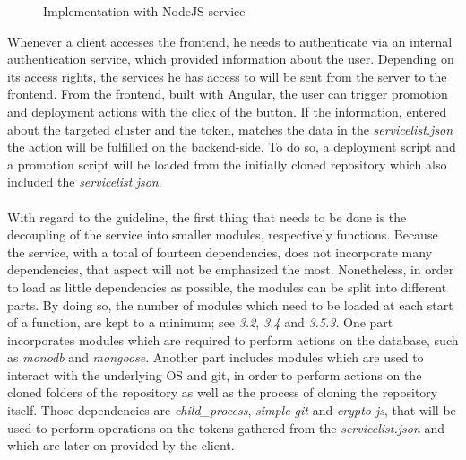 \documentclass[a4paper,twoside,11pt, pagesize]{scrartcl}
\begin{document}
\begin{spacing}{1.2}
\begin{figure}[H]
\caption{Implementation with NodeJS service}
\end{figure}  
Whenever a client accesses the frontend, he needs to authenticate via an internal authentication service, which provided information about the user. Depending on its access rights, the services he has access to will be sent from the server to the frontend. From the frontend, built with Angular, the user can trigger promotion and deployment actions with the click of the button. If the information, entered about the targeted cluster and the token, matches the data in the \textit{servicelist.json} the action will be fulfilled on the backend-side. To do so, a deployment script and a promotion script will be loaded from the initially cloned repository which also included the \textit{servicelist.json}. \\\\With regard to the guideline, the first thing that needs to be done is the decoupling of the service into smaller modules, respectively functions. Because the service, with a total of fourteen dependencies, does not incorporate many dependencies, that aspect will not be emphasized the most. Nonetheless, in order to load as little dependencies as possible, the modules can be split into different parts. By doing so, the number of modules which need to be loaded at each start of a function, are kept to a minimum; see \textit{3.2}, \textit{3.4} and \textit{3.5.3}. One part incorporates modules which are required to perform actions on the database, such as \textit{monodb} and \textit{mongoose}. Another part includes modules which are used to interact with the underlying OS and git, in order to perform actions on the cloned folders of the repository as well as the process of cloning the repository itself. Those dependencies are \textit{child\_process}, \textit{simple-git} and \textit{crypto-js}, that will be used to perform operations on the tokens gathered from the \textit{servicelist.json} and which are later on provided by the client.\\\\

\end{spacing}
\end{document}
